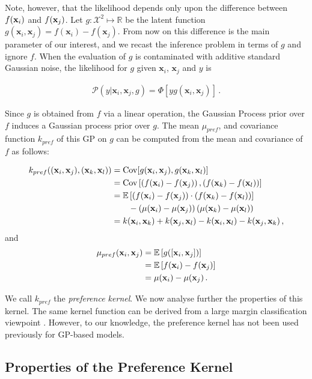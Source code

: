 Note, however, that the likelihood depends only upon the difference between $f(\mathbf{x}_i)$ and $f(\mathbf{x}_j)$. 
Let $g:\mathcal{X}^2\mapsto\mathbb{R}$ be the latent function $g(\mathbf{x}_i,\mathbf{x}_j) = f(\mathbf{x}_i) - f(\mathbf{x}_j)$. 
From now on this difference is the main parameter of our interest, and we recast the inference problem in terms of $g$ and ignore $f$. When the evaluation of $g$ is contaminated with additive standard Gaussian noise,
the likelihood for $g$ given $\mathbf{x}_i$, $\mathbf{x}_j$ and $y$ is

\begin{align}
\mathcal{P}(y|\mathbf{x}_i,\mathbf{x}_j,g) = \Phi[yg(\mathbf{x}_i, \mathbf{x}_j)]\,.\label{eq:likelihood2}
\end{align}

Since $g$ is obtained from $f$ via a linear operation, the Gaussian Process prior over $f$ induces a Gaussian process prior over $g$. The mean $\mu_{pref}$, and covariance function $k_{pref}$ of this GP on $g$ can be computed from the mean and covariance of $f$ as follows:

\begin{align}
	k_{pref}((\mathbf{x}_i,\mathbf{x}_j),(\mathbf{x}_k,\mathbf{x}_l)) &= \mathrm{Cov}[g(\mathbf{x}_i,\mathbf{x}_j),g(\mathbf{x}_k,\mathbf{x}_l)]\notag\\
		&= \mathrm{Cov}\left[\left(f(\mathbf{x}_i) - f(\mathbf{x}_j)\right) , \left(f(\mathbf{x}_k)  - f(\mathbf{x}_l)\right)\right]\notag\\
		&= \mathbb{E}\left[\left(f(\mathbf{x}_i) - f(\mathbf{x}_j)\right)\cdot \left(f(\mathbf{x}_k) - f(\mathbf{x}_l)\right)\right] \notag\\ &\qquad - \left(\mu(\mathbf{x}_i) -  \mu(\mathbf{x}_j)\right) \left(\mu(\mathbf{x}_k) - \mu(\mathbf{x}_l)\right)\notag\\
		&= k(\mathbf{x}_i,\mathbf{x}_k) + k(\mathbf{x}_j,\mathbf{x}_l) - k(\mathbf{x}_i,\mathbf{x}_l) - k(\mathbf{x}_j,\mathbf{x}_k)\notag\,,
\end{align}
and
\begin{align}
	\mu_{pref}(\mathbf{x}_i,\mathbf{x}_j) &= \mathbb{E}\left[g([\mathbf{x}_i,\mathbf{x}_j])\right]\notag\\ &= \mathbb{E}\left[f(\mathbf{x}_i) - f(\mathbf{x}_j)\right]\notag\\ &= \mu(\mathbf{x}_i) - \mu(\mathbf{x}_j)\,.
\end{align}

We call $k_{pref}$ the \emph{preference kernel}. We now analyse further the properties of this kernel.
The same kernel function can be derived from a large margin classification
viewpoint \cite{furnkranz2010}. However, to our knowledge, the preference kernel has not been used
previously for GP-based models.

\subsection{Properties of the Preference Kernel}

